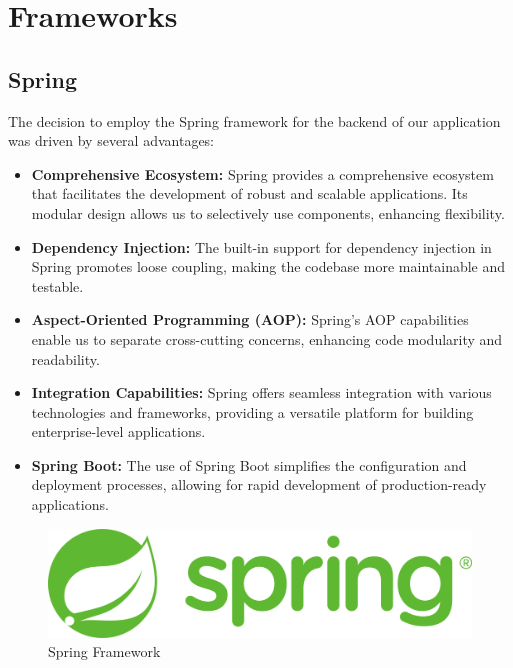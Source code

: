 \documentclass{Configuration_Files/Template}
\begin{document}
\section{Frameworks}

\subsection{Spring}
The decision to employ the Spring framework for the backend of our application was driven by several advantages:

\begin{itemize}
    \item \textbf{Comprehensive Ecosystem:} Spring provides a comprehensive ecosystem that facilitates the development of robust and scalable applications. Its modular design allows us to selectively use components, enhancing flexibility.
    
    \item \textbf{Dependency Injection:} The built-in support for dependency injection in Spring promotes loose coupling, making the codebase more maintainable and testable.
    
    \item \textbf{Aspect-Oriented Programming (AOP):} Spring's AOP capabilities enable us to separate cross-cutting concerns, enhancing code modularity and readability.
    
    \item \textbf{Integration Capabilities:} Spring offers seamless integration with various technologies and frameworks, providing a versatile platform for building enterprise-level applications.
    
    \item \textbf{Spring Boot:} The use of Spring Boot simplifies the configuration and deployment processes, allowing for rapid development of production-ready applications.\\
\end{itemize}

\begin{figure}[h]
    \centering
    \includegraphics[scale = 0.08]{ITD_latex/Images/Frameworks/spring.png}
    \caption{Spring Framework}
\end{figure}
\end{document}
